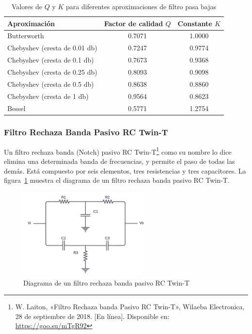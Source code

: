             \begin{table}[H]
                \centering
                \begin{tabular}{ l | c | c }
                    Aproximación & Factor de calidad $Q$ & Constante $K$ \\ \hline
                    Butterworth & 0.7071 & 1.0000 \\
                    Chebyshev (cresta de 0.01 db) & 0.7247 & 0.9774 \\
                    Chebyshev (cresta de 0.1 db) & 0.7673 & 0.9368 \\
                    Chebyshev (cresta de 0.25 db) & 0.8093 & 0.9098\\
                    Chebyshev (cresta de 0.5 db) & 0.8638 & 0.8860\\
                    Chebyshev (cresta de 1 db) & 0.9564 & 0.8623\\
                    Bessel & 0.5771 & 1.2754\\
                \end{tabular}
                \caption{Valores de $Q$ y $K$ para diferentes aproximaciones de filtro pasa bajas}
                \label{tab:valores_filtro_pasa_bajas}
            \end{table}

        \subsubsection{Filtro Rechaza Banda Pasivo RC Twin-T}

            Un filtro rechaza banda (Notch) pasivo RC Twin-T\footnote{W. Laiton, «Filtro Rechaza banda Pasivo RC Twin-T», Wilaeba Electronica, 28 de septiembre de 2018. [En línea]. Disponible en: \url{https://goo.su/mTgR92}} como su nombre lo dice elimina una determinada banda de frecuencias, y permite el paso de todas las demás. Está compuesto por seis elementos, tres resistencias y tres capacitores. La figura~\ref{fig:Filtro_Rechaza_Banda} muestra el diagrama de un filtro rechaza banda pasivo RC Twin-T.

            \begin{figure}[H]
                \centering
                \includegraphics[width=0.6\textwidth]{img/Marco/Filtro_Rechaza_Banda.png}
                \caption[Diagrama de un filtro rechaza banda pasivo RC Twin-T.]{Diagrama de un filtro rechaza banda pasivo RC Twin-T}
                \label{fig:Filtro_Rechaza_Banda}
            \end{figure}

